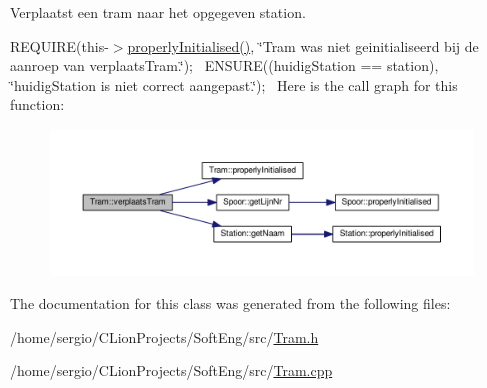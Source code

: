 Verplaatst een tram naar het opgegeven station. 

R\+E\+Q\+U\+I\+RE(this-\/$>$\hyperlink{class_tram_ac2688f590e4db232b4f535c9bf959efb}{properly\+Initialised()}, \char`\"{}\+Tram was niet geinitialiseerd bij de aanroep van verplaats\+Tram.\char`\"{});~\newline
E\+N\+S\+U\+RE((huidig\+Station == station), \char`\"{}huidig\+Station is niet correct aangepast.\char`\"{});~\newline
Here is the call graph for this function\+:
\nopagebreak
\begin{figure}[H]
\begin{center}
\leavevmode
\includegraphics[width=350pt]{class_tram_ab2a78d1ff86257b8dd27a3b0abc440ee_cgraph}
\end{center}
\end{figure}


The documentation for this class was generated from the following files\+:\begin{DoxyCompactItemize}
\item 
/home/sergio/\+C\+Lion\+Projects/\+Soft\+Eng/src/\hyperlink{_tram_8h}{Tram.\+h}\item 
/home/sergio/\+C\+Lion\+Projects/\+Soft\+Eng/src/\hyperlink{_tram_8cpp}{Tram.\+cpp}\end{DoxyCompactItemize}

